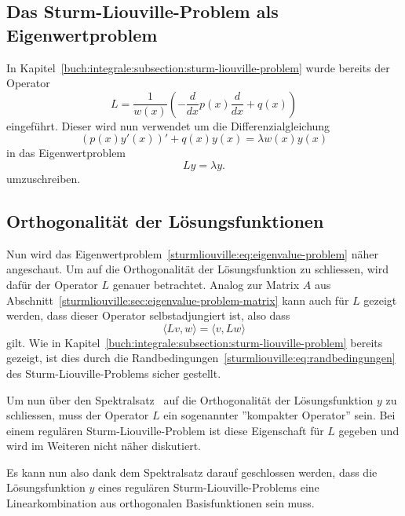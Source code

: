 \subsection{Das Sturm-Liouville-Problem als Eigenwertproblem}

In Kapitel~\ref{buch:integrale:subsection:sturm-liouville-problem} wurde bereits
der Operator
\[
    L
    =
    \frac{1}{w(x)}\left( -\frac{d}{dx}p(x) \frac{d}{dx} + q(x)\right)
\]
eingeführt.
Dieser wird nun verwendet um die Differenzialgleichung 
\[
    (p(x)y'(x))' + q(x)y(x)
    =
    \lambda w(x) y(x)
\]
in das Eigenwertproblem
\begin{equation}
    \label{sturmliouville:eq:eigenvalue-problem}
    L y
    =
    \lambda y.
\end{equation}
umzuschreiben.

\subsection{Orthogonalität der Lösungsfunktionen}

Nun wird das Eigenwertproblem~\eqref{sturmliouville:eq:eigenvalue-problem} näher
angeschaut.
Um auf die Orthogonalität der Lösungsfunktion zu schliessen, wird dafür der
Operator $L$ genauer betrachtet.
Analog zur Matrix $A$ aus 
Abschnitt~\ref{sturmliouville:sec:eigenvalue-problem-matrix} kann auch für
$L$ gezeigt werden, dass dieser Operator selbstadjungiert ist, also dass
\[
    \langle L v, w\rangle
    =
    \langle v, L w\rangle
\]
gilt.
Wie in Kapitel~\ref{buch:integrale:subsection:sturm-liouville-problem} bereits
gezeigt, ist dies durch die
Randbedingungen~\eqref{sturmliouville:eq:randbedingungen} des
Sturm-Liouville-Problems sicher gestellt.

Um nun über den Spektralsatz~\cite{sturmliouville:spektralsatz-wiki} auf die
Orthogonalität der Lösungsfunktion $y$ zu schliessen, muss der Operator $L$ ein
sogenannter ''kompakter Operator'' sein.
Bei einem regulären Sturm-Liouville-Problem ist diese Eigenschaft für $L$
gegeben und wird im Weiteren nicht näher diskutiert.

Es kann nun also dank dem Spektralsatz darauf geschlossen werden, dass die
Lösungsfunktion $y$ eines regulären Sturm-Liouville-Problems eine
Linearkombination aus orthogonalen Basisfunktionen sein muss.
